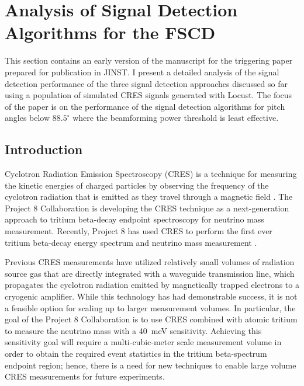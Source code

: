 \section{Analysis of Signal Detection Algorithms for the FSCD}
\label{sec:chap4-trigger-paper}
This section contains an early version of the manuscript for the triggering paper prepared for publication in JINST. I present a detailed analysis of the signal detection performance of the three signal detection approaches discussed so far using a population of simulated CRES signals generated with Locust. The focus of the paper is on the performance of the signal detection algorithms for pitch angles below $88.5^\circ$ where the beamforming power threshold is least effective.

\subsection{Introduction}
\label{sec:intro}
Cyclotron Radiation Emission Spectroscopy (CRES) is a technique for measuring the kinetic energies of charged particles by observing the frequency of the cyclotron radiation that is emitted as they travel through a magnetic field \cite{p8originalcres}. %
The Project 8 Collaboration is developing the CRES technique as a next-generation approach to tritium beta-decay endpoint spectroscopy for neutrino mass measurement. Recently, Project 8 has used CRES to perform the first ever tritium beta-decay energy spectrum and neutrino mass measurement \cite{p8prl2023, p8prc2023}.

Previous CRES measurements have utilized relatively small volumes of radiation source gas that are directly integrated with a waveguide transmission line, which propagates the cyclotron radiation emitted by magnetically trapped electrons to a cryogenic amplifier. While this technology has had demonstrable success, it is not a feasible option for scaling up to larger measurement volumes. In particular, the goal of the Project 8 Collaboration is to use CRES combined with atomic tritium to measure the neutrino mass with a 40~meV sensitivity. Achieving this sensitivity goal will require a multi-cubic-meter scale measurement volume in order to obtain the required event statistics in the tritium beta-spectrum endpoint region; hence, there is a need for new techniques to enable large volume CRES measurements for future experiments.

